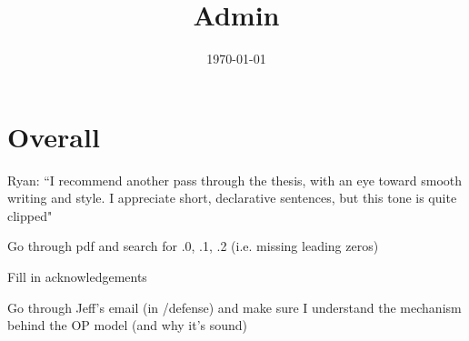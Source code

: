 \documentclass[12pt]{article}
\title{Admin}
\date{\today}
\begin{document}
\maketitle

\section*{Overall}
	\begin{coi}
		\item Ryan: ``I recommend another pass through the thesis, with an eye toward smooth writing and style. I appreciate short, declarative sentences, but this tone is quite clipped"
		\item Go through pdf and search for .0, .1, .2 (i.e. missing leading zeros)
		\item Fill in acknowledgements
		\item Go through Jeff's email (in /defense) and make sure I understand the mechanism behind the OP model (and why it's sound)
	\end{coi}	
\end{document}
